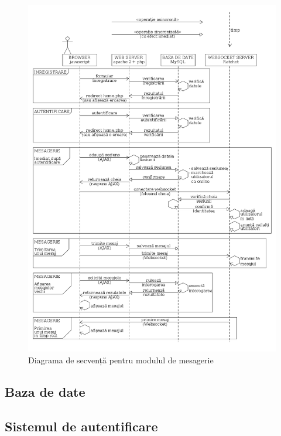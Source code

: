 \documentclass[12pt,a4paper]{article}
\begin{document}
%
\newpage
\begin{figure}[!ht]
\centering
\includegraphics[height=0.97\textheight]{diagrame/chat_sequence.png}
\vspace{-20pt} 
\caption{Diagrama de secvență pentru modulul de mesagerie \label{overflow}}
\vspace{-20pt} 
\end{figure}
 


\subsection{Baza de date}

\subsection{Sistemul de autentificare}
\end{document}
